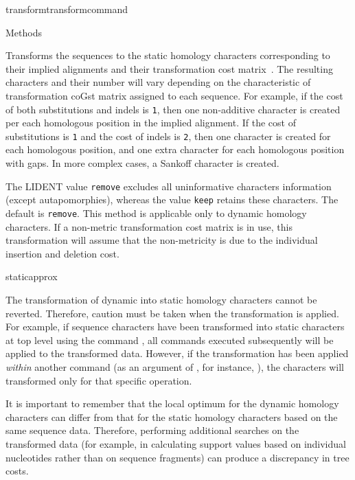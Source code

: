 \begin{command}{transform}{transformcommand}
\begin{arguments}
\begin{argumentgroup}{Methods}
            {Transforms the sequences to the static homology characters
            corresponding to their implied alignments and their transformation
            cost matrix~\cite{wheeler2003}. The resulting characters and their number will vary
            depending on the characteristic of transformation coGst matrix
            assigned to each sequence. For example, if the cost of both substitutions
            and indels is \texttt{1}, then one non-additive character is created per
            each homologous position in the implied alignment. If the cost of
            substitutions is \texttt{1} and the cost of indels  is \texttt{2}, then
            one character is created for each homologous position, and one extra character for
            each homologous position with gaps. In more complex cases, a Sankoff character is
            created.
            
            The LIDENT value \texttt{remove} excludes all uninformative characters
            information (except autapomorphies), whereas the value \texttt{keep}
            retains these characters. The default is \texttt{remove}. This
            method is applicable only to dynamic homology characters. If
            a non-metric transformation cost matrix is in use, this
            transformation will assume that the non-metricity is due to the
            individual insertion and deletion cost.}
            {staticapprox}
            
            \begin{statement}
  	  The transformation of dynamic into static homology characters cannot be reverted.
	  Therefore, caution must be taken when the transformation is applied. For example,
	  if sequence characters have been transformed into static characters at top level using
	  the command , all commands executed 
	  subsequently will be applied to the transformed data. However, if the transformation has 
	  been applied \emph{within} another command (as an argument of , 
	  for instance, ), the characters will transformed only for that specific operation.
	   \end{statement}
	
	\begin{statement}
  	  It is important to remember that the local optimum for the dynamic homology
	  characters can differ from that for the static homology characters based on the
	  same sequence data. Therefore, performing additional searches on the transformed
	  data (for example, in calculating support values based on individual nucleotides
	  rather than on sequence fragments) can produce a discrepancy in tree costs.
	\end{statement}


\end{argumentgroup}
\end{arguments}
\end{command}
